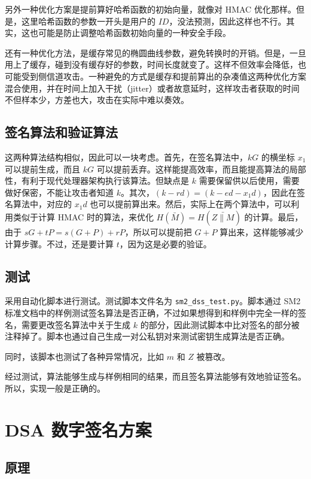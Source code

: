 \documentclass[12pt,a4paper]{article}
\begin{document}
另外一种优化方案是提前算好哈希函数的初始向量，就像对 HMAC 优化那样。但是，这里哈希函数的参数一开头是用户的 $ {ID} $，没法预测，因此这样也不行。其实，这也可能是防止调整哈希函数初始向量的一种安全手段。

还有一种优化方法，是缓存常见的椭圆曲线参数，避免转换时的开销。但是，一旦用上了缓存，碰到没有缓存好的参数，时间长度就变了。这样不但效率会降低，也可能受到侧信道攻击。一种避免的方式是缓存和提前算出的杂凑值这两种优化方案混合使用，并在时间上加入干扰（jitter）或者故意延时，这样攻击者获取的时间不但样本少，方差也大，攻击在实际中难以奏效。

\subsection*{签名算法和验证算法}

这两种算法结构相似，因此可以一块考虑。首先，在签名算法中，$ k G $ 的横坐标 $ x_1 $ 可以提前生成，而且 $ k G $ 可以提前丢弃。这样能提高效率，而且能提高算法的局部性，有利于现代处理器架构执行该算法。但缺点是 $ k $ 需要保留供以后使用，需要做好保密，不能让攻击者知道 $ k $。其次，$ (k - r d) = (k - e d - x_1 d ) $，因此在签名算法中，对应的 $ x_1 d $ 也可以提前算出来。然后，实际上在两个算法中，可以利用类似于计算 HMAC 时的算法，来优化 $ H(\bar{M}) = H(\bar{Z \parallel M}) $ 的计算。最后，由于 $ s G + t P = s (G + P) + r P $，所以可以提前把 $ G + P $ 算出来，这样能够减少计算步骤。不过，还是要计算 $ t $，因为这是必要的验证。

\subsection*{测试}

采用自动化脚本进行测试。测试脚本文件名为 \verb|sm2_dss_test.py|。脚本通过 SM2 标准文档中的样例测试签名算法是否正确，不过如果想得到和样例中完全一样的签名，需要更改签名算法中关于生成 $ k $ 的部分，因此测试脚本中比对签名的部分被注释掉了。脚本也通过自己生成一对公私钥对来测试密钥生成算法是否正确。

同时，该脚本也测试了各种异常情况，比如 $ m $ 和 $ Z $ 被篡改。

经过测试，算法能够生成与样例相同的结果，而且签名算法能够有效地验证签名。所以，实现一般是正确的。

\section*{DSA 数字签名方案}

\subsection*{原理}
\end{document}
